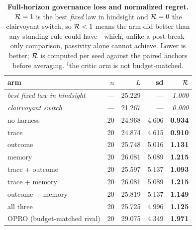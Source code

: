 \begin{table}[t]\centering\small
\caption{\textbf{Full-horizon governance loss and normalized regret.} $\mathcal{R}=1$ is the best
\emph{fixed} law in hindsight and $\mathcal{R}=0$ the clairvoyant switch, so $\mathcal{R}<1$ means the arm
did better than any standing rule could have---which, unlike a post-break-only comparison, passivity
alone cannot achieve. Lower is better; $\mathcal{R}$ is computed per seed against the paired anchors
before averaging. $^{\dagger}$the critic arm is not budget-matched.}
\label{tab:arms}
\begin{tabular}{@{}l r r r r@{}}
\toprule
arm & $n$ & $L$ & sd & $\mathcal{R}$ \\
\midrule
\textit{best fixed law in hindsight} & --- & 25.229 & --- & \textit{1.000} \\
\textit{clairvoyant switch} & --- & 21.267 & --- & \textit{0.000} \\
\midrule
no harness & 20 & 24.968 & 4.606 & \textbf{0.934} \\
trace & 20 & 24.874 & 4.615 & \textbf{0.910} \\
outcome & 20 & 25.748 & 5.016 & \textbf{1.131} \\
memory & 20 & 26.081 & 5.089 & \textbf{1.215} \\
trace + outcome & 20 & 25.597 & 5.137 & \textbf{1.093} \\
trace + memory & 20 & 26.081 & 5.089 & \textbf{1.215} \\
outcome + memory & 20 & 25.819 & 5.137 & \textbf{1.149} \\
all three & 20 & 25.725 & 4.996 & \textbf{1.125} \\
OPRO (budget-matched rival) & 20 & 29.075 & 4.349 & \textbf{1.971} \\
\bottomrule
\end{tabular}
\end{table}
